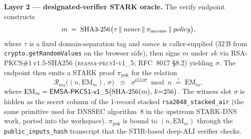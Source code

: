 \documentclass[11pt,a4paper]{article}
\begin{document}
\textbf{Layer 2 — designated\nobreakdash-verifier STARK
oracle.}  The verify endpoint constructs
\[
m \;=\; \mathrm{SHA3\textnormal-256}\bigl(
    \tau \,\Vert\, \mathit{nonce}
       \,\Vert\, \pi_{\mathrm{income}}
       \,\Vert\, \mathit{policy}\bigr),
\]
where $\tau$ is a fixed domain\nobreakdash-separation tag and
$\mathit{nonce}$ is caller\nobreakdash-supplied
($32$\,B from \texttt{crypto.getRandomValues} on the browser
side), then signs $m$ under $\mathit{sk}$ via
RSA\nobreakdash-PKCS\#1\,v$1.5$\nobreakdash-SHA256
(\textsc{rsassa\nobreakdash-pkcs1\nobreakdash-v1\_5}; RFC~8017
§8.2) yielding $\sigma$.  The endpoint then emits a STARK proof
$\pi_{\mathrm{pok}}$ for the relation
\[
\mathcal{R}_{\mathrm{rsa}}\bigl((n,\mathrm{EM}_m),\,\sigma\bigr)
\;\;\equiv\;\;
\sigma^{65537} \bmod n \;\stackrel{?}{=}\; \mathrm{EM}_m,
\]
where $\mathrm{EM}_m =
\mathsf{EMSA\textnormal-PKCS1\textnormal-v1\_5}\bigl(
\mathrm{SHA\textnormal-256}(m),\, k {=} 256\bigr)$.  The
witness slot $\sigma$ is hidden as the secret column of the
$1$\nobreakdash-record stacked
\texttt{rsa2048\_stacked\_air} (the same primitive used for
DNSSEC algorithm~$8$ in the upstream STARK\nobreakdash-DNS
work, ported into the workspace).  $\pi_{\mathrm{pok}}$ is
bound to $(n, \mathrm{EM}_m)$ through the
\texttt{public\_inputs\_hash} transcript that the
STIR\nobreakdash-based deep\nobreakdash-ALI verifier checks.
\end{document}
